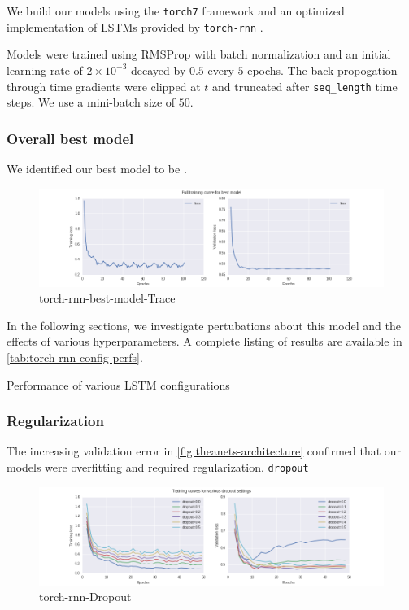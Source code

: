We build our models using the \texttt{torch7} framework and
an optimized implementation of LSTMs provided by \texttt{torch-rnn} .

Models were trained using RMSProp  with batch normalization 
and an initial learning rate of $2 \times 10^{-3}$ decayed by $0.5$ every $5$
epochs. The back-propogation through time gradients were clipped
at $t$  and truncated after \texttt{seq\_length} time steps.
We use a mini-batch size of $50$.

\subsubsection{Overall best model}

We identified our best model to be .

\begin{figure}[htpb]
  \centering
  \includegraphics[width=1.0\linewidth]{torch-rnn-best-model-trace.png}
  \caption{torch-rnn-best-model-Trace}
  \label{fig:torch-rnn-best-model-trace}
\end{figure}

In the following sections, we investigate pertubations about this model and the
effects of various hyperparameters. A complete listing of results are available
in
\cref{tab:torch-rnn-config-perfs}.
\begin{table}[htpb]
    \centering
    \caption{Performance of various LSTM configurations}
    \label{tab:torch-rnn-config-perfs}
    
\end{table}

\subsubsection{Regularization}

The increasing validation error in \cref{fig:theanets-architecture} confirmed
that our models were overfitting and required regularization. \texttt{dropout}

\begin{figure}[htpb]
  \centering
  \includegraphics[width=1.0\linewidth]{torch-rnn-dropout.png}
  \caption{torch-rnn-Dropout}
  \label{fig:torch-rnn-dropout}
\end{figure}

